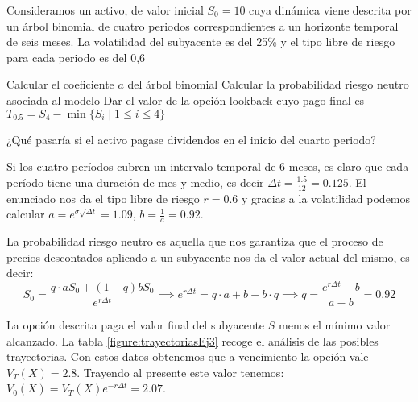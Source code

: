 \begin{problem}[3]
Consideramos un activo, de valor inicial $S_0 = 10$ cuya dinámica viene descrita por un árbol binomial
de cuatro periodos correspondientes a un horizonte temporal de seis meses. La volatilidad del
subyacente es del 25\% y el tipo libre de riesgo para cada periodo es del 0,6%

\ppart Calcular el coeficiente $a$ del árbol binomial
\ppart Calcular la probabilidad riesgo neutro asociada al modelo
\ppart Dar el valor de la opción lookback cuyo pago final es $T_{0.5}=S_4-\min\{S_i \mid 1 \leq i \leq 4\}$

\ppart ¿Qué pasaría si el activo pagase dividendos en el inicio del cuarto periodo?
\solution


\spart

Si los cuatro períodos cubren un intervalo temporal de 6 meses, es claro que cada período tiene una duración de mes y medio, es decir $Δt=\frac{1.5}{12}=0.125$. El enunciado nos da el tipo libre de riesgo $r=0.6$ y gracias a la volatilidad podemos calcular $a=e^{σ\sqrt{Δt}}=1.09$, $b=\frac{1}{a}=0.92$.

\spart

La probabilidad riesgo neutro es aquella que nos garantiza que el proceso de precios descontados aplicado a un subyacente nos da el valor actual del mismo, es decir:
\[S_0 = \frac{q\cdot aS_0 + (1-q)bS_0}{e^{rΔt}}\implies e^{rΔt}=q\cdot a +b - b\cdot q \implies q = \frac{e^{rΔt}-b}{a-b} = 0.92\]

\spart

La opción descrita paga el valor final del subyacente $S$ menos el mínimo valor alcanzado. La tabla \ref{figure:trayectoriasEj3} recoge el análisis de las posibles trayectorias. Con estos datos obtenemos que a vencimiento la opción vale $V_T(X)=2.8$. Trayendo al presente este valor tenemos: $V_0(X) = V_T(X)e^{-rΔt}=2.07$.


\end{problem}
